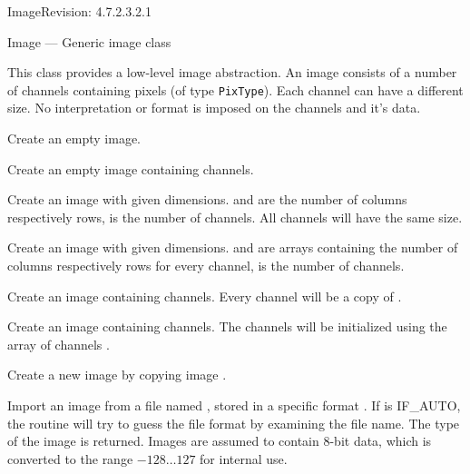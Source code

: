 \begin{manpage}{\libtitle}{Image}{$ $Revision: 4.7.2.3.2.1 $ $}

\subtitle{Name}
    Image --- Generic image class


\subtitle{Description}
    This class provides a low-level image abstraction. An image consists of a
    number of channels containing pixels (of type \texttt{PixType}).
    Each channel can have a different size. No interpretation or format is
    imposed on the channels and it's data.


\subtitle{Declaration}

    Create an empty image.

    Create an empty image containing channels.

    Create an image with given dimensions.  and  are the
    number of columns respectively rows,  is the number of
    channels. All channels will have the same size.

    Create an image with given dimensions.  and  are
    arrays containing the number of columns respectively rows for every
    channel,  is the number of channels.

    Create an image containing channels. Every channel will be a
    copy of .

    Create an image containing channels. The channels will be
    initialized using the array of channels .

    Create a new image by copying image .


\subtitle{Public \\ Operations}

    Import an image from a file named , stored in a specific
    format . If  is IF\_AUTO, the routine will try
    to guess the file format by examining the file name. The type of the image
    is returned. Images are assumed to contain 8-bit data, which is converted
    to the range $-128 \ldots 127$ for internal use.


\end{manpage}
